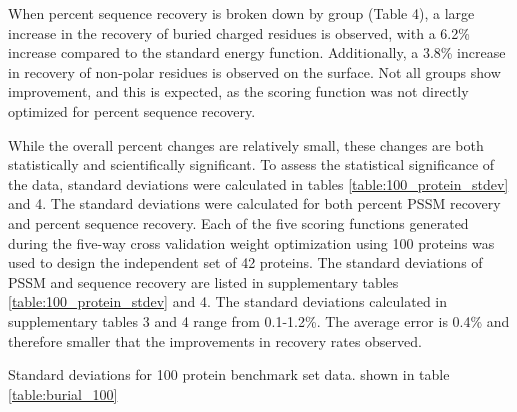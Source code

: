  When percent sequence recovery is broken down by group (Table 4), a large increase in the recovery of buried charged residues is observed, with a 6.2\% increase compared to the standard energy function. 
 Additionally, a 3.8\% increase in recovery of non-polar residues is observed on the surface.
 Not all groups show improvement, and this is expected, as the scoring function was not directly optimized for percent sequence recovery.
 
While the overall percent changes are relatively small, these changes are both statistically and scientifically significant.
To assess the statistical significance of the data, standard deviations were calculated in tables \ref{table:100_protein_stdev} and 4.
The standard deviations were calculated for both percent PSSM recovery and percent sequence recovery.
Each of the five scoring functions generated during the five-way cross validation weight optimization using 100 proteins was used to design the independent set of 42 proteins.
The standard deviations of PSSM and sequence recovery are listed in supplementary tables \ref{table:100_protein_stdev} and 4.
The standard deviations calculated in supplementary tables 3 and 4 range from 0.1-1.2\%. 
The average error is 0.4\% and therefore smaller that the improvements in recovery rates observed. 

\begin{table}
\scriptsize
\renewcommand{\tabcolsep}{0.09cm}
\centering

\caption{Standard deviations for 100 protein benchmark set data. shown in table \ref{table:burial_100}}
\label{table:100_protein_stdev}
\end{table}

